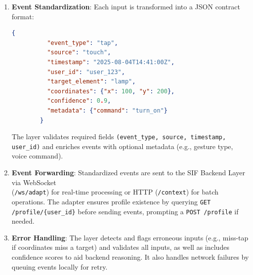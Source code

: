 \documentclass[openany]{book}
\begin{document}
\begin{enumerate}
        \item \textbf{Event Standardization}: Each input is transformed into a JSON contract format:
        \begin{lstlisting}[language=json,firstnumber=1]
        {
          "event_type": "tap",
          "source": "touch",
          "timestamp": "2025-08-04T14:41:00Z",
          "user_id": "user_123",
          "target_element": "lamp",
          "coordinates": {"x": 100, "y": 200},
          "confidence": 0.9,
          "metadata": {"command": "turn_on"}
        }
        \end{lstlisting}
        The layer validates required fields \verb|(event_type, source, timestamp, user_id)| and enriches events with optional metadata (e.g., gesture type, voice command).
        \item \textbf{Event Forwarding}: Standardized events are sent to the SIF Backend Layer via WebSocket \\ (\verb|/ws/adapt|) for real-time processing or HTTP (\verb|/context|) for batch operations. The adapter ensures profile existence by querying \verb|GET /profile/{user_id}| before sending events, prompting a \verb|POST /profile| if needed.
        \item \textbf{Error Handling}: The layer detects and flags erroneous inputs (e.g., miss-tap if coordinates miss a target) and validates all inputs, as well as includes confidence scores to aid backend reasoning. It also handles network failures by queuing events locally for retry.
    \end{enumerate}
    
\end{document}
